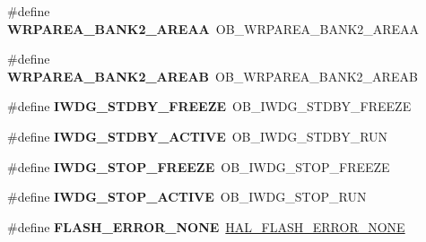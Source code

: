 \begin{DoxyCompactItemize}
\item 
\mbox{\label{group___h_a_l___f_l_a_s_h___aliased___defines_ga385f3bbec731cc31de0a8f83943f678c}} 
\#define {\bfseries W\+R\+P\+A\+R\+E\+A\+\_\+\+B\+A\+N\+K2\+\_\+\+A\+R\+E\+AA}~O\+B\+\_\+\+W\+R\+P\+A\+R\+E\+A\+\_\+\+B\+A\+N\+K2\+\_\+\+A\+R\+E\+AA
\item 
\mbox{\label{group___h_a_l___f_l_a_s_h___aliased___defines_gad9e82d85eb324cdc5d4c5071a5b41dc6}} 
\#define {\bfseries W\+R\+P\+A\+R\+E\+A\+\_\+\+B\+A\+N\+K2\+\_\+\+A\+R\+E\+AB}~O\+B\+\_\+\+W\+R\+P\+A\+R\+E\+A\+\_\+\+B\+A\+N\+K2\+\_\+\+A\+R\+E\+AB
\item 
\mbox{\label{group___h_a_l___f_l_a_s_h___aliased___defines_ga29ecb28c7e5de9b73778a4de74cdba4e}} 
\#define {\bfseries I\+W\+D\+G\+\_\+\+S\+T\+D\+B\+Y\+\_\+\+F\+R\+E\+E\+ZE}~O\+B\+\_\+\+I\+W\+D\+G\+\_\+\+S\+T\+D\+B\+Y\+\_\+\+F\+R\+E\+E\+ZE
\item 
\mbox{\label{group___h_a_l___f_l_a_s_h___aliased___defines_ga24bb71bfed2d31ab1c89e2c14617a738}} 
\#define {\bfseries I\+W\+D\+G\+\_\+\+S\+T\+D\+B\+Y\+\_\+\+A\+C\+T\+I\+VE}~O\+B\+\_\+\+I\+W\+D\+G\+\_\+\+S\+T\+D\+B\+Y\+\_\+\+R\+UN
\item 
\mbox{\label{group___h_a_l___f_l_a_s_h___aliased___defines_gafa9a4aaff8763eed2aaeae674dffd159}} 
\#define {\bfseries I\+W\+D\+G\+\_\+\+S\+T\+O\+P\+\_\+\+F\+R\+E\+E\+ZE}~O\+B\+\_\+\+I\+W\+D\+G\+\_\+\+S\+T\+O\+P\+\_\+\+F\+R\+E\+E\+ZE
\item 
\mbox{\label{group___h_a_l___f_l_a_s_h___aliased___defines_gab00290e46777b5c22558554403dee8c4}} 
\#define {\bfseries I\+W\+D\+G\+\_\+\+S\+T\+O\+P\+\_\+\+A\+C\+T\+I\+VE}~O\+B\+\_\+\+I\+W\+D\+G\+\_\+\+S\+T\+O\+P\+\_\+\+R\+UN
\item 
\mbox{\label{group___h_a_l___f_l_a_s_h___aliased___defines_ga12c2b55f5c37a54b5733d005ce82a0de}} 
\#define {\bfseries F\+L\+A\+S\+H\+\_\+\+E\+R\+R\+O\+R\+\_\+\+N\+O\+NE}~\hyperlink{group___f_l_a_s_h___error___code_gae7fb9ee7198d393aba27ade3a9f50a70}{H\+A\+L\+\_\+\+F\+L\+A\+S\+H\+\_\+\+E\+R\+R\+O\+R\+\_\+\+N\+O\+NE}

\end{DoxyCompactItemize}
